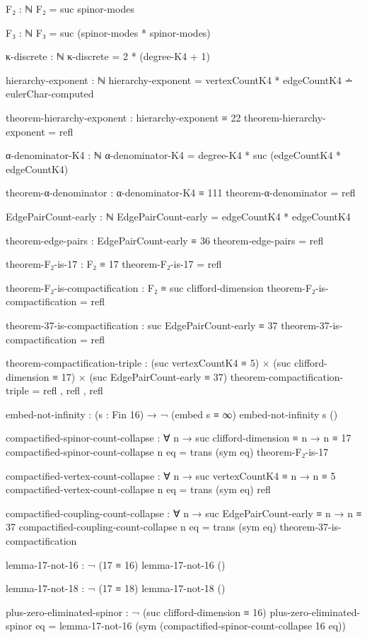 \documentclass[11pt,a4paper]{book}
\begin{document}
\begin{code}
F₂ : ℕ
F₂ = suc spinor-modes

F₃ : ℕ
F₃ = suc (spinor-modes * spinor-modes)

κ-discrete : ℕ
κ-discrete = 2 * (degree-K4 + 1)


hierarchy-exponent : ℕ
hierarchy-exponent = vertexCountK4 * edgeCountK4 ∸ eulerChar-computed

theorem-hierarchy-exponent : hierarchy-exponent ≡ 22
theorem-hierarchy-exponent = refl

α-denominator-K4 : ℕ
α-denominator-K4 = degree-K4 * suc (edgeCountK4 * edgeCountK4)

theorem-α-denominator : α-denominator-K4 ≡ 111
theorem-α-denominator = refl

EdgePairCount-early : ℕ
EdgePairCount-early = edgeCountK4 * edgeCountK4

theorem-edge-pairs : EdgePairCount-early ≡ 36
theorem-edge-pairs = refl

theorem-F₂-is-17 : F₂ ≡ 17
theorem-F₂-is-17 = refl

theorem-F₂-is-compactification : F₂ ≡ suc clifford-dimension
theorem-F₂-is-compactification = refl

theorem-37-is-compactification : suc EdgePairCount-early ≡ 37
theorem-37-is-compactification = refl

theorem-compactification-triple : 
  (suc vertexCountK4 ≡ 5) × (suc clifford-dimension ≡ 17) × (suc EdgePairCount-early ≡ 37)
theorem-compactification-triple = refl , refl , refl

embed-not-infinity : (s : Fin 16) → ¬ (embed s ≡ ∞)
embed-not-infinity s ()

compactified-spinor-count-collapse : ∀ n → suc clifford-dimension ≡ n → n ≡ 17
compactified-spinor-count-collapse n eq = trans (sym eq) theorem-F₂-is-17

compactified-vertex-count-collapse : ∀ n → suc vertexCountK4 ≡ n → n ≡ 5
compactified-vertex-count-collapse n eq = trans (sym eq) refl

compactified-coupling-count-collapse : ∀ n → suc EdgePairCount-early ≡ n → n ≡ 37
compactified-coupling-count-collapse n eq = trans (sym eq) theorem-37-is-compactification

lemma-17-not-16 : ¬ (17 ≡ 16)
lemma-17-not-16 ()

lemma-17-not-18 : ¬ (17 ≡ 18)
lemma-17-not-18 ()

plus-zero-eliminated-spinor : ¬ (suc clifford-dimension ≡ 16)
plus-zero-eliminated-spinor eq = lemma-17-not-16 (sym (compactified-spinor-count-collapse 16 eq))


\end{code}
\end{document}
